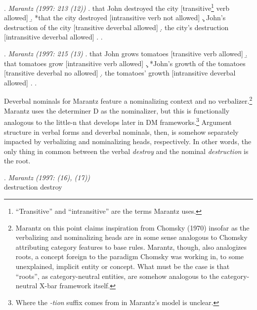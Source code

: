 \documentclass[12pt]{article}
\begin{document}
\singlespacing
\ex. \label{Marantzd} \textit{Marantz (1997: 213 (12))}
\a. \label{Marantzd1} that John destroyed the city \hfill [transitive\footnote{ ``Transitive'' and ``intransitive'' are the terms Marantz uses.} verb allowed]
\b. *that the city destroyed \hfill [intransitive verb not allowed]
\c. \label{Marantzd2} John's destruction of the city \hfill [transitive deverbal allowed]
\d. the city's destruction \hfill [intransitive deverbal allowed]
\z. \z.

\ex. \label{Marantzg}\textit{Marantz (1997: 215 (13)}
\a. \label{Marantzg1} that John grows tomatoes \hfill [transitive verb allowed]
\b. that tomatoes grow \hfill [intransitive verb allowed]
\c. \label{Marantzg2} *John's growth of the tomatoes \hfill [transitive deverbal no allowed]
\d. the tomatoes' growth \hfill [intransitive deverbal allowed]
\z. \z. \par

\doublespacing

\noindent Deverbal nominals for Marantz feature a nominalizing context and no verbalizer.\footnote{ Marantz on this point claims inspiration from Chomsky (1970) insofar as the verbalizing and nominalizing heads are in some sense analogous to Chomsky attributing category features to base rules. Marantz, though, also analogizes roots, a concept foreign to the paradigm Chomsky was working in, to some unexplained, implicit entity or concept. What must be the case is that ``roots'', as category-neutral entities, are somehow analogous to the category-neutral X-bar framework itself.} Marantz uses the determiner D as the nominalizer, but this is functionally analogous to the little-n that develops later in DM frameworks.\footnote{ Where the \textit{-tion} suffix comes from in Marantz's model is unclear.} Argument structure in verbal forms and deverbal nominals, then, is somehow separately impacted by verbalizing and nominalizing heads, respectively. In other words, the only thing in common between the verbal \textit{destroy} and the nominal \textit{destruction} is the root.

\singlespacing

\ex. \label{Marantz} \textit{Marantz (1997: (16), (17))} \\ destruction \hspace{2in} destroy

\vspace*{-10pt}
\end{document}
